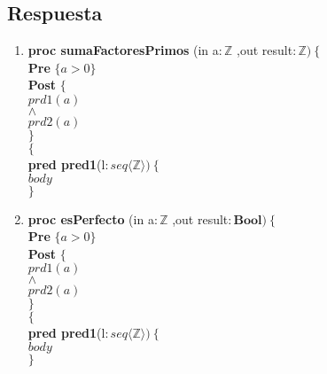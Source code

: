 \documentclass[a4paper]{article}
\begin{document}
\subsection*{Respuesta}
	\begin{enumerate}[label=\alph*)]
		\item
			
			\textbf{proc sumaFactoresPrimos }(in a$:\mathbb{Z}$
				,out result$: \mathbb{Z} )\ \{$\smallskip \\
			\hspace*{6mm} \textbf{Pre }$\{a>0 \}$\smallskip \\
			\hspace*{6mm} \textbf{Post }$\{$\\
			\hspace*{6mm} $prd1(a)$\\
			\hspace*{6mm} $\wedge$\\
			\hspace*{6mm} $prd2(a)$\\
			\hspace*{6mm} $\}$\\
			$\{$\smallskip \\
			
			\textbf{pred pred1}(l$: seq\langle \mathbb{Z}\rangle)\ \{$\smallskip \\
			\hspace*{6mm}$body$\\
			$\}$			
			
		\item
			
			\textbf{proc esPerfecto }(in a$:\mathbb{Z}$
				,out result$:\textbf{Bool} )\ \{$\smallskip \\
			\hspace*{6mm} \textbf{Pre }$\{a>0 \}$\smallskip \\
			\hspace*{6mm} \textbf{Post }$\{$\\
			\hspace*{6mm} $prd1(a)$\\
			\hspace*{6mm} $\wedge$\\
			\hspace*{6mm} $prd2(a)$\\
			\hspace*{6mm} $\}$\\
			$\{$\smallskip \\
			
			\textbf{pred pred1}(l$: seq\langle \mathbb{Z}\rangle)\ \{$\smallskip \\
			\hspace*{6mm}$body$\\
			$\}$	
			

\end{enumerate}
\end{document}
